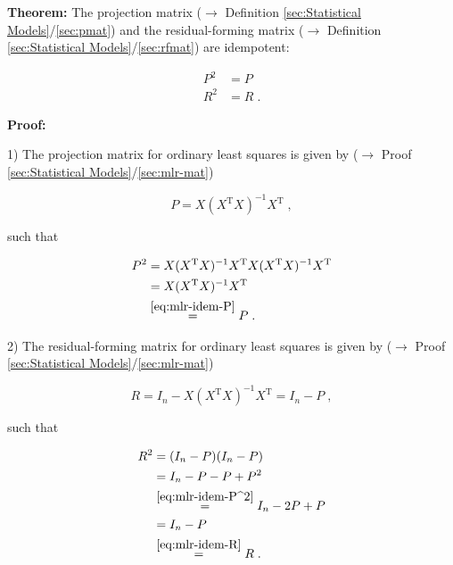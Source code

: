 \documentclass[a4paper,12pt,twoside]{book}
\begin{document}
\textbf{Theorem:} The projection matrix ($\rightarrow$ Definition \ref{sec:Statistical Models}/\ref{sec:pmat}) and the residual-forming matrix ($\rightarrow$ Definition \ref{sec:Statistical Models}/\ref{sec:rfmat}) are idempotent:

\begin{equation} \label{eq:mlr-idem-P^2-R^2}
\begin{split}
P^2 &= P \\
R^2 &= R \; .
\end{split}
\end{equation}


\vspace{1em}
\textbf{Proof:}

1) The projection matrix for ordinary least squares is given by ($\rightarrow$ Proof \ref{sec:Statistical Models}/\ref{sec:mlr-mat})

\begin{equation} \label{eq:mlr-idem-P}
P = X (X^\mathrm{T} X)^{-1} X^\mathrm{T} \; ,
\end{equation}

such that

\begin{equation} \label{eq:mlr-idem-P^2}
\begin{split}
P^2 &= X (X^\mathrm{T} X)^{-1} X^\mathrm{T} X (X^\mathrm{T} X)^{-1} X^\mathrm{T} \\
&= X (X^\mathrm{T} X)^{-1} X^\mathrm{T} \\
&\overset{\eqref{eq:mlr-idem-P}}{=} P \; .
\end{split}
\end{equation}

\vspace{1em}
2) The residual-forming matrix for ordinary least squares is given by ($\rightarrow$ Proof \ref{sec:Statistical Models}/\ref{sec:mlr-mat})

\begin{equation} \label{eq:mlr-idem-R}
R = I_n - X (X^\mathrm{T} X)^{-1} X^\mathrm{T} = I_n - P \; ,
\end{equation}

such that

\begin{equation} \label{eq:mlr-idem-R^2}
\begin{split}
R^2 &= (I_n - P) (I_n - P) \\
&= I_n - P - P + P^2 \\
&\overset{\eqref{eq:mlr-idem-P^2}}{=} I_n - 2 P + P \\
&= I_n - P \\
&\overset{\eqref{eq:mlr-idem-R}}{=} R \; .
\end{split}
\end{equation}
\end{document}

